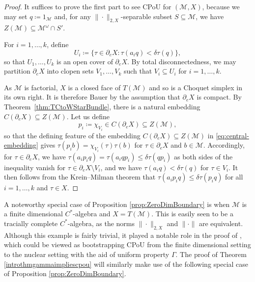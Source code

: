 \documentclass[a4paper,11pt]{amsart}
\theoremstyle{definition}
\numberwithin{equation}{section}
\numberwithin{theorem}{section}
\newcommand{\M}{\mathcal{M}}
\begin{document}
\begin{proof}
	It suffices to prove the first part to see CPoU for $(\M,X)$, because we may set $q\coloneqq 1_{\mathcal M}$ and, for any $\|\cdot\|_{2, X}$-separable subset $S \subseteq \M$, we have $Z(\M) \subseteq \M^\omega \cap S'$.
		
	For $i=1,\ldots,k$, define
	\begin{equation} 
		U_i\coloneqq \{\tau \in \partial_e X: \tau(a_iq) < \delta \tau(q) \}, 
	\end{equation}
	so that $U_1,\dots,U_k$ is an open cover of $\partial_e X$.  By total disconnectedness, we may partition $\partial_e X$ into clopen sets $V_1,\dots,V_k$ such that $V_i \subseteq U_i$ for $i=1,\dots,k$.
	
	As $\M$ is factorial, $X$ is a closed face of $T(\M)$ and so is a Choquet simplex in its own right.  It is therefore Bauer by the assumption that  $\partial_e X$ is compact.  By Theorem~\ref{thm:TCtoWStarBundle}, there is a natural embedding $C(\partial_e X) \subseteq Z(\M)$. Let us define 
	\begin{equation}
		p_i\coloneqq \chi_{V_i} \in C(\partial_e X) \subseteq Z(\M),
	\end{equation}
 so that the defining feature of the embedding $C(\partial_e X) \subseteq Z(\M)$ in \eqref{eq:central-embedding} gives $\tau(p_ib)=\chi_{V_i}(\tau)\tau(b)$ for $\tau\in\partial_eX$ and $b\in\M$. Accordingly, for $\tau\in \partial_eX$, we have $\tau(a_ip_iq)=\tau(a_iqp_i)\leq\delta\tau(qp_i)$ as both sides of the inequality vanish for $\tau\in\partial_eX\setminus V_i$, and we have $\tau(a_iq) < \delta \tau(q)$ for $\tau \in V_i$. 
 It then follows from the Krein--Milman theorem that $\tau(a_i p_iq) \leq \delta \tau(p_iq)$ for all $i = 1, \ldots, k$ and $\tau \in X$.
\end{proof}

A noteworthy special case of Proposition \ref{prop:ZeroDimBoundary} is when $\M$ is a finite dimensional $C^*$-algebra and $X = T(\M)$. This is easily seen to be a tracially complete $C^*$-algebra, as the norms $\|\cdot\|_{2,X}$ and $\|\cdot\|$ are equivalent. Although this example is fairly trivial, it played a notable role in the proof of \cite[Theorem 3.8]{CETWW}, which could be viewed as bootstrapping CPoU from the finite dimensional setting to the nuclear setting with the aid of uniform property $\Gamma$. The proof of Theorem \ref{introthmgammaimpliescpou} will similarly make use of the following special case of Proposition \ref{prop:ZeroDimBoundary}.
\end{document}
